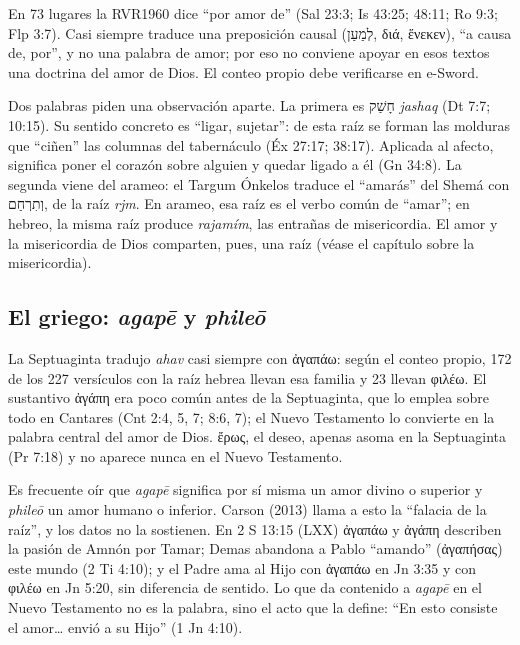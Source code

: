\documentclass[11pt,letterpaper]{article}
\newcommand{\heb}[1]{\mbox{\foreignlanguage{hebrew}{#1}}}
\newcommand{\grc}[1]{\foreignlanguage{ancientgreek}{#1}}
\begin{document}
\begin{nota}[Precisión]
En 73 lugares la RVR1960 dice ``por amor de'' (Sal 23:3; Is 43:25; 48:11; Ro 9:3; Flp 3:7). Casi siempre traduce una preposición causal (\heb{לְמַעַן}, \grc{διά}, \grc{ἕνεκεν}), ``a causa de, por'', y no una palabra de amor; por eso no conviene apoyar en esos textos una doctrina del amor de Dios. El conteo propio debe verificarse en e-Sword.
\end{nota}

Dos palabras piden una observación aparte. La primera es \heb{חָשַׁק} \emph{jashaq} (Dt 7:7; 10:15). Su sentido concreto es ``ligar, sujetar'': de esta raíz se forman las molduras que ``ciñen'' las columnas del tabernáculo (Éx 27:17; 38:17). Aplicada al afecto, significa poner el corazón sobre alguien y quedar ligado a él (Gn 34:8). La segunda viene del arameo: el Targum Ónkelos traduce el ``amarás'' del Shemá con \heb{וְתִרְחַם}, de la raíz \emph{rjm}. En arameo, esa raíz es el verbo común de ``amar''; en hebreo, la misma raíz produce \emph{rajamím}, las entrañas de misericordia. El amor y la misericordia de Dios comparten, pues, una raíz (véase el capítulo sobre la misericordia).

\subsection{El griego: \emph{agapē} y \emph{phileō}}
La Septuaginta tradujo \emph{ahav} casi siempre con \grc{ἀγαπάω}: según el conteo propio, 172 de los 227 versículos con la raíz hebrea llevan esa familia y 23 llevan \grc{φιλέω}. El sustantivo \grc{ἀγάπη} era poco común antes de la Septuaginta, que lo emplea sobre todo en Cantares (Cnt 2:4, 5, 7; 8:6, 7); el Nuevo Testamento lo convierte en la palabra central del amor de Dios. \grc{ἔρως}, el deseo, apenas asoma en la Septuaginta (Pr 7:18) y no aparece nunca en el Nuevo Testamento.

\begin{nota}[Precisión]
Es frecuente oír que \emph{agapē} significa por sí misma un amor divino o superior y \emph{phileō} un amor humano o inferior. Carson (2013) llama a esto la ``falacia de la raíz'', y los datos no la sostienen. En 2 S 13:15 (LXX) \grc{ἀγαπάω} y \grc{ἀγάπη} describen la pasión de Amnón por Tamar; Demas abandona a Pablo ``amando'' (\grc{ἀγαπήσας}) este mundo (2 Ti 4:10); y el Padre ama al Hijo con \grc{ἀγαπάω} en Jn 3:35 y con \grc{φιλέω} en Jn 5:20, sin diferencia de sentido. Lo que da contenido a \emph{agapē} en el Nuevo Testamento no es la palabra, sino el acto que la define: ``En esto consiste el amor\ldots{} envió a su Hijo'' (1 Jn 4:10).
\end{nota}
\end{document}
